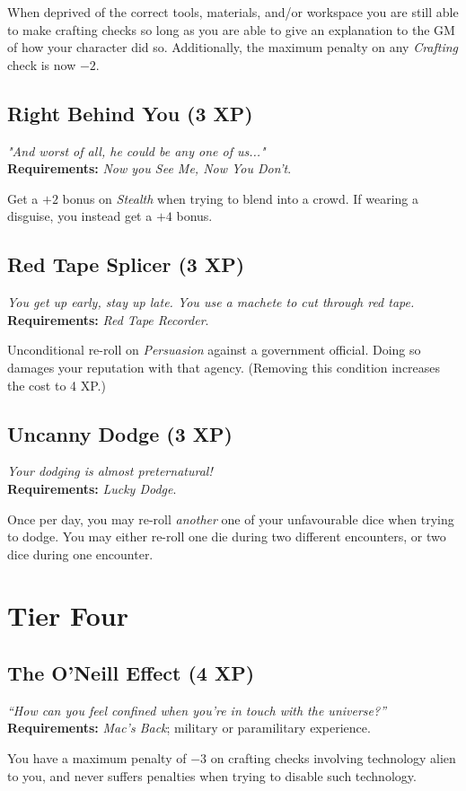When deprived of the correct tools, materials, and/or workspace you are still able to make crafting checks so long as you are able to give an explanation to the GM of how your character did so.
Additionally, the maximum penalty on any \textit{Crafting} check is now $-2$.

\subsection{Right Behind You (3 XP)}
\textit{"And worst of all, he could be any one of us..."}\\
\textbf{Requirements:} \textit{Now you See Me, Now You Don't}.

Get a $+2$ bonus on \textit{Stealth} when trying to blend into a crowd.
If wearing a disguise, you instead get a $+4$ bonus.

\subsection{Red Tape Splicer (3 XP)}
\textit{You get up early, stay up late. You use a machete to cut through red tape.}\\
\textbf{Requirements:} \textit{Red Tape Recorder}.

Unconditional re-roll on \textit{Persuasion} against a government official.
Doing so damages your reputation with that agency.
(Removing this condition increases the cost to 4 XP.)

\subsection{Uncanny Dodge (3 XP)}
\textit{Your dodging is almost preternatural!}\\
\textbf{Requirements:} \textit{Lucky Dodge}.

Once per day, you may re-roll \textit{another} one of your unfavourable dice when trying to dodge.
You may either re-roll one die during two different encounters, or two dice during one encounter.

\section{Tier Four}

\subsection{The O'Neill Effect (4 XP)}
\textit{``How can you feel confined when you're in touch with the universe?''}\\
\textbf{Requirements:} \textit{Mac's Back}; military or paramilitary experience. 

You have a maximum penalty of $-3$ on crafting checks involving technology alien to you, and never suffers penalties when trying to disable such technology.